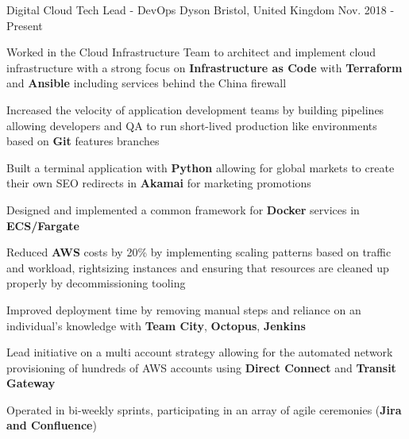 
\begin{cventries}

  \cventry
    {Digital Cloud Tech Lead - DevOps} %
    {Dyson} %
    {Bristol, United Kingdom} %
    {Nov. 2018 - Present} %
    {
      \begin{cvitems} %
        \item {Worked in the Cloud Infrastructure Team to architect and implement cloud infrastructure with a strong focus on \textbf{Infrastructure as Code} with \textbf{Terraform} and \textbf{Ansible} including services behind the China firewall}
        \item {Increased the velocity of application development teams by building pipelines allowing developers and QA to run short-lived production like environments based on \textbf{Git} features branches}
        \item {Built a terminal application with \textbf{Python} allowing for global markets to create their own SEO redirects in \textbf{Akamai} for marketing promotions}
        \item {Designed and implemented a common framework for \textbf{Docker} services in \textbf{ECS/Fargate}}
        \item {Reduced \textbf{AWS} costs by 20\% by implementing scaling patterns based on traffic and workload, rightsizing instances and ensuring that resources are cleaned up properly by decommissioning tooling}
        \item {Improved deployment time by removing manual steps and reliance on an individual’s knowledge with \textbf{Team City}, \textbf{Octopus}, \textbf{Jenkins}}
        \item {Lead initiative on a multi account strategy allowing for the automated network provisioning of hundreds of AWS accounts using \textbf{Direct Connect} and \textbf{Transit Gateway}}
        \item {Operated in bi-weekly sprints, participating in an array of agile ceremonies (\textbf{Jira and Confluence})}
      \end{cvitems}
    }


\end{cventries}
